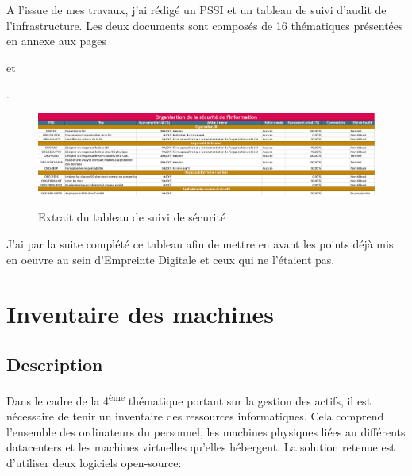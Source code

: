 \documentclass[12pt]{article}
\begin{document}
A l'issue de mes travaux, j'ai rédigé un \gls{PSSI} et un tableau de suivi d'audit de l'infrastructure. 
Les deux documents sont composés de 16 thématiques présentées en annexe aux pages \begin{hilite} \pageref{tab:16thematiques1} \end{hilite} et \begin{hilite} \pageref{tab:16thematiques2} \end{hilite}.
\begin{figure}[!ht]
    \centering
    \includegraphics[width=\textwidth]{src/table_ssi.png}
    \label{fig:pssi_table}
    \caption{Extrait du tableau de suivi de sécurité}
\end{figure}

J'ai par la suite complété ce tableau afin de mettre en avant les points déjà mis en oeuvre au sein d'Empreinte Digitale et ceux qui ne l'étaient pas.

\newpage
\section{Inventaire des machines}
\subsection{Description}

Dans le cadre de la 4\textsuperscript{ème} thématique portant sur la gestion des actifs, il est nécessaire de tenir un inventaire des ressources informatiques. 
Cela comprend l'ensemble des ordinateurs du personnel, les machines physiques liées au différents datacenters et les machines virtuelles qu'elles hébergent.
La solution retenue est d'utiliser deux logiciels open-source:
\end{document}
